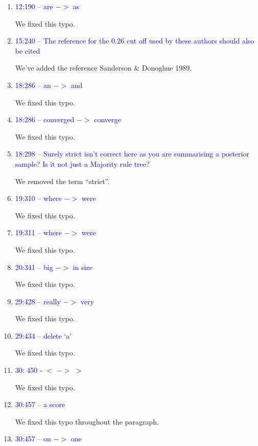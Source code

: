 \documentclass[12pt,letterpaper]{article}
\begin{document}
\begin{enumerate}
\item{\textcolor{blue}{12:190 – are $->$ as}}

We fixed this typo.

\item{\textcolor{blue}{15:240 – The reference for the 0.26 cut off used by these authors should also be cited}}

We've added the reference Sanderson \& Donoghue 1989.

\item{\textcolor{blue}{18:286 – an $->$ and}}

We fixed this typo.

\item{\textcolor{blue}{18:286 – converged $->$ converge}}

We fixed this typo.

\item{\textcolor{blue}{18:298 – Surely strict isn't correct here as you are summarising a posterior sample? Is it not just a Majority rule tree?}}

We removed the term ``strict''.

\item{\textcolor{blue}{19:310 – where $->$ were}}

We fixed this typo.

\item{\textcolor{blue}{19:311 – where $->$ were}}

We fixed this typo.

\item{\textcolor{blue}{20:341 – big $->$ in size}}

We fixed this typo.

\item{\textcolor{blue}{29:428 – really $->$ very}}

We fixed this typo.

\item{\textcolor{blue}{29:434 – delete `a'}}

We fixed this typo.

\item{\textcolor{blue}{30: 450 - $<$ $->$ $>$}}

We fixed this typo.

\item{\textcolor{blue}{30:457 – a score}}

We fixed this typo throughout the paragraph.

\item{\textcolor{blue}{30:457 – on $->$ one}}


\end{enumerate}
\end{document}
